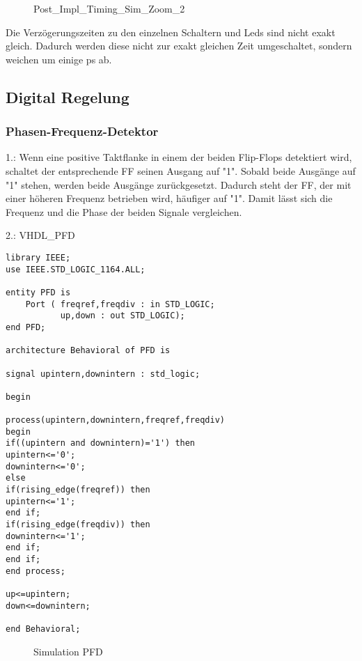 \documentclass{article}
\begin{document}
\begin{figure}[H]
\begin{center}
\caption{Post\_Impl\_Timing\_Sim\_Zoom\_2}
\end{center}
\end{figure}
Die Verz\"ogerungszeiten zu den einzelnen Schaltern und Leds sind nicht exakt gleich. Dadurch werden diese nicht zur exakt gleichen Zeit umgeschaltet, sondern weichen um einige ps ab.

\subsection{Digital Regelung}
\subsubsection{Phasen-Frequenz-Detektor}
1.:\newline
Wenn eine positive Taktflanke in einem der beiden Flip-Flops detektiert wird, schaltet der entsprechende FF seinen Ausgang auf "1". Sobald beide Ausg\"ange auf "1" stehen, werden beide Ausg\"ange zur\"uckgesetzt. Dadurch steht der FF, der mit einer h\"oheren Frequenz betrieben wird, h\"aufiger auf "1". Damit l\"asst sich die Frequenz und die Phase der beiden Signale vergleichen.\newline

2.:\newline
VHDL\_PFD\newline
\begin{verbatim}
library IEEE;
use IEEE.STD_LOGIC_1164.ALL;

entity PFD is
    Port ( freqref,freqdiv : in STD_LOGIC;
           up,down : out STD_LOGIC);
end PFD;

architecture Behavioral of PFD is

signal upintern,downintern : std_logic;

begin

process(upintern,downintern,freqref,freqdiv)
begin
if((upintern and downintern)='1') then
upintern<='0';
downintern<='0';
else
if(rising_edge(freqref)) then
upintern<='1';
end if;
if(rising_edge(freqdiv)) then
downintern<='1';
end if;
end if;
end process;

up<=upintern;
down<=downintern;

end Behavioral;
\end{verbatim}
\begin{figure}[H]
\begin{center}
\caption{Simulation PFD}
\end{center}
\end{figure}
\end{document}
